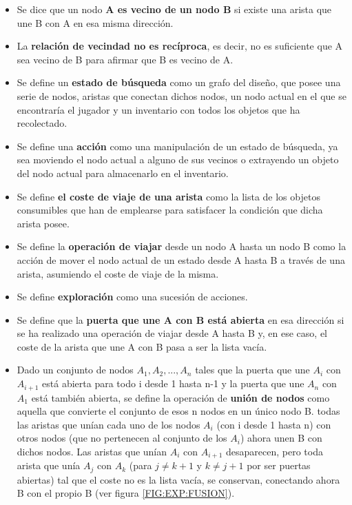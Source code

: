 \begin{itemize}
	\item Se dice que un nodo \textbf{A es vecino de un nodo B} si existe una arista que une B con A en esa misma dirección.
	
	\item La \textbf{relación de vecindad no es recíproca}, es decir, no es suficiente que A sea vecino de B para afirmar que B es vecino de A.
	
	\item Se define un \textbf{estado de búsqueda} como un grafo del diseño, que posee una serie de nodos, aristas que conectan dichos nodos, un nodo actual en el que se encontraría el jugador y un inventario con todos los objetos que ha recolectado.
	
	\item Se define una \textbf{acción} como una manipulación de un estado de búsqueda, ya sea moviendo el nodo actual a alguno de sus vecinos o extrayendo un objeto del nodo actual para almacenarlo en el inventario.
	
	\item Se define \textbf{el coste de viaje de una arista} como la lista de los objetos consumibles que han de emplearse para satisfacer la condición que dicha arista posee.
	
	\item Se define la \textbf{operación de viajar} desde un nodo A hasta un nodo B como la acción de mover el nodo actual de un estado desde A hasta B a través de una arista, asumiendo el coste de viaje de la misma.
	
	\item Se define \textbf{exploración} como una sucesión de acciones.
	
	\item Se define que la \textbf{puerta que une A con B está abierta} en esa dirección si se ha realizado una operación de viajar desde A hasta B y, en ese caso, el coste de la arista que une A con B pasa a ser la lista vacía.
	
	\item Dado un conjunto de nodos ${A_1, A_2, ..., A_n}$ tales que la puerta que une $A_i$ con $A_{i+1}$ está abierta para todo i desde 1 hasta n-1 y la puerta que une $A_n$ con $A_1$ está también abierta, se define la operación de \textbf{unión de nodos} como aquella que convierte el conjunto de esos n nodos en un único nodo B. todas las aristas que unían cada uno de los nodos $A_i$ (con i desde 1 hasta n) con otros nodos (que no pertenecen al conjunto de los $A_i$) ahora unen B con dichos nodos. Las aristas que unían $A_i$ con $A_{i+1}$ desaparecen, pero toda arista que unía $A_j$ con $A_k$ (para $j \not= k+1$ y $k \not= j+1$ por ser puertas abiertas) tal que el coste no es la lista vacía, se conservan, conectando ahora B con el propio B (ver figura \ref{FIG:EXP:FUSION}).
	

\end{itemize}
